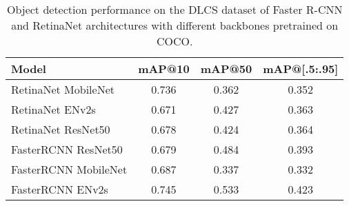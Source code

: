 \begin{table}[h]
    \centering
    \caption{Object detection performance on the DLCS dataset of Faster R-CNN and RetinaNet architectures with different backbones pretrained on COCO.}
    \label{tab:dlcs-models-not-pretrained}
    \begin{tabular}{lccc}
    \hline
    \textbf{Model} & \textbf{mAP@10} & \textbf{mAP@50} & \textbf{mAP@[.5:.95]} \\
    \hline
    RetinaNet MobileNet  & 0.736 & 0.362 & 0.352 \\
    RetinaNet ENv2s      & 0.671 & 0.427 & 0.363 \\
    RetinaNet ResNet50   & 0.678 & 0.424 & 0.364 \\
    FasterRCNN ResNet50  & 0.679 & 0.484 & 0.393 \\
    FasterRCNN MobileNet & 0.687 & 0.337 & 0.332\\
    FasterRCNN ENv2s     & 0.745 & 0.533 & 0.423 \\
    \hline
    \end{tabular}
\end{table}